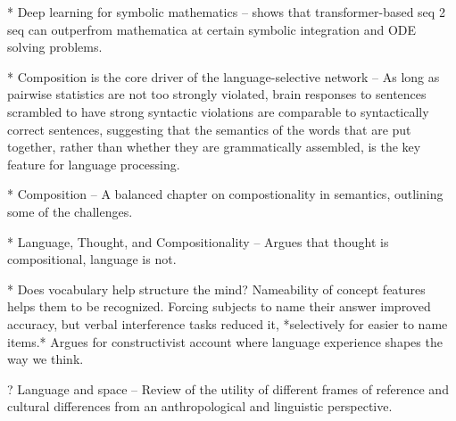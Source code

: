 * Deep learning for symbolic mathematics -- shows that transformer-based seq 2 seq can outperfrom mathematica at certain symbolic integration and ODE solving problems. \citep{Lample2019} 

* Composition is the core driver of the language-selective network -- As long as pairwise statistics are not too strongly violated, brain responses to sentences scrambled to have strong syntactic violations are comparable to syntactically correct sentences, suggesting that the semantics of the words that are put together, rather than whether they are grammatically assembled, is the key feature for language processing. \citep{Mollica2020}

* Composition -- A balanced chapter on compostionality in semantics, outlining some of the challenges. \citep{Goldberg2015}

* Language, Thought, and Compositionality -- Argues that thought is compositional, language is not. \citep{Fodor2001}

* Does vocabulary help structure the mind? Nameability of concept features helps them to be recognized. Forcing subjects to name their answer improved accuracy, but verbal interference tasks reduced it, *selectively for easier to name items.* Argues for constructivist account where language experience shapes the way we think. \citep{Lupyan2020}

? Language and space -- Review of the utility of different frames of reference and cultural differences from an anthropological and linguistic perspective. \citep{Levinson1996}
